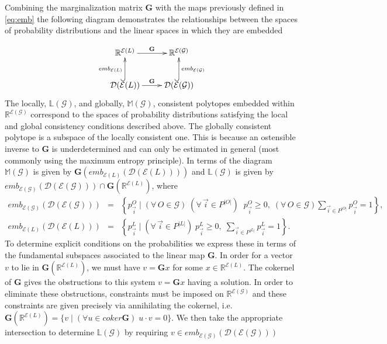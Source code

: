 Combining the marginalization matrix $\mathbf{G}$ with the maps previously defined in \ref{eq:emb} the following diagram demonstrates the relationships between the spaces of probability distributions and the linear spaces in which they are embedded

\begin{equation*}
\xymatrix{
 \mathbb{R}^{\mathcal{E}(L)} \ar[r]^{\mathbf{G}} &
   \mathbb{R}^{\mathcal{E}(\mathcal{G})} \\
 \dist (\mathcal{E}(L)) \ar[r]^{\mathbf{G}} \ar@{^{(}->}[u]^{emb_{\mathcal{E}(L)}}& \ar@{^{(}->}[u]_{emb_{\mathcal{E}(\mathcal{G})}}
  \dist (\mathcal{E}(\mathcal{G}))
  }
\end{equation*}
The locally, $\mathbb{L}(\mathcal{G})$, and globally, $\mathbb{M}(\mathcal{G})$, consistent polytopes embedded within $\mathbb{R}^{\mathcal{E}(\mathcal{G})}$ correspond to the spaces of probability distributions satisfying the local and global consistency conditions described above. The globally consistent polytope is a subspace of the locally consistent one. This is because an ostensible inverse to $\mathbf{G}$ is underdetermined and can only be estimated in general (most commonly using the maximum entropy principle). In terms of the diagram $\mathbb{M}(\mathcal{G})$ is given by $\mathbf{G}(emb_{\mathcal{E}(L)}(\mathcal{D}(\mathcal{E}(L))))$ and $\mathbb{L}(\mathcal{G})$ is given by $emb_{\mathcal{E}(\mathcal{G})}(\mathcal{D}(\mathcal{E}(\mathcal{G}))) \cap \mathbf{G}(\mathbb{R}^{\mathcal{E}(L)})$, where
\begin{eqnarray}
emb_{\mathcal{E}(\mathcal{G})}(\mathcal{D}(\mathcal{E}(\mathcal{G}))) &=& \left\{ p^{O}_{\vec{i}} \; \bigg| \; (\forall\, O \in \mathcal{G}) \; (\forall\, \vec{i} \in P^{|O|}) \;\; p^O_{\vec{i}} \geq 0, \; (\forall\, O \in \mathcal{G}) \sum_{\vec{i} \in P^{|O|}} p^{O}_{\vec{i}} = 1 \right\},\\
emb_{\mathcal{E}(L)}(\mathcal{D}(\mathcal{E}(L))) &=& \left\{ p^L_{\vec{i}} \; \bigg| \; (\forall\, \vec{i} \in P^{|L|}) \; p^L_{\vec{i}} \geq 0, \; \sum_{\vec{i} \in P^{|L|}} p^L_{\vec{i}} = 1 \right\}.
\end{eqnarray}
To determine explicit conditions on the probabilities we express these in terms of the fundamental subspaces associated to the linear map $\mathbf{G}$. In order for a vector $v$ to lie in $\mathbf{G}(\mathbb{R}^{\mathcal{E}(L)})$, we must have $v=\mathbf{G}x$ for some $x \in \mathbb{R}^{\mathcal{E}(L)}$.  The cokernel of $\mathbf{G}$ gives the obstructions to this system $v=\mathbf{G}x$ having a solution. In order to eliminate these obstructions, constraints must be imposed on $\mathbb{R}^{\mathcal{E}(\mathcal{G})}$ and these constraints are given precisely via annihilating the cokernel, i.e. $\mathbf{G}(\mathbb{R}^{\mathcal{E}(L)}) = \{ v \; | \; (\forall u \in coker \mathbf{G}) \; u \cdot v = 0\}$.  We then take the appropriate intersection to determine $\mathbb{L}(\mathcal{G})$ by requiring $v \in emb_{\mathcal{E}(\mathcal{G})}(\mathcal{D}(\mathcal{E}(\mathcal{G})))$
